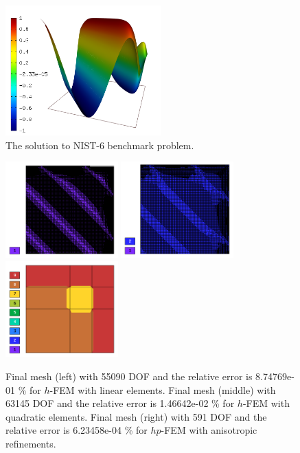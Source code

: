 \documentclass[12pt]{elsarticle}
\begin{document}
\begin{figure}[H]
\centering
\vspace{-3mm}
\includegraphics[height=5cm]{nist/nist-6/solution.png}
\caption{The solution to NIST-6 benchmark problem.}
\vspace{-3mm}
\label{fig:sln-nist06}
\end{figure}

\begin{figure}[H]
\centering
\includegraphics[height=3.7cm]{nist/nist-6/mesh_h1_aniso.png}
\includegraphics[height=3.7cm]{nist/nist-6/mesh_h2_aniso.png}
\includegraphics[height=3.7cm]{nist/nist-6/mesh_hp_aniso.png}
\vspace{-3mm}
\caption{
Final mesh (left) with 55090 DOF and the relative error is 8.74769e-01 \% for $h$-FEM with linear elements.
Final mesh (middle) with 63145 DOF and the relative error is 1.46642e-02 \% for $h$-FEM with quadratic elements.
Final mesh (right) with 591 DOF and the relative error is 6.23458e-04 \% for $hp$-FEM with anisotropic refinements.}
\vspace{-2mm}
\label{fig:nist-6-hp-aniso}
\end{figure}
\end{document}
